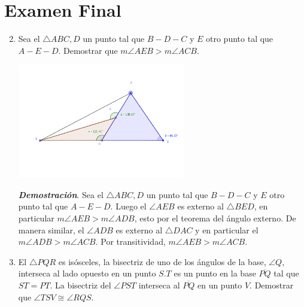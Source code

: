 \documentclass{report}
\begin{document}
    \tableofcontents

    \pagebreak
    \chapter{ Examen Final }

    \begin{enumerate}
        \setcounter{enumi}{1}
        \item Sea el $\triangle A B C, D$ un punto tal que $B-D-C$ y $E$ otro punto tal que $A-E-D$. Demostrar que $m \angle A E B>m \angle A C B$.

        \begin{center}
            \includegraphics*[height=5cm]{images/figura1.png}
        \end{center}
        \textit{\textbf{Demostración}}. Sea el $\triangle A B C, D$ un punto tal que $B-D-C$ y $E$ otro punto tal que $A-E-D$. Luego el $\angle AEB$ es externo al $\triangle BED$, en particular $m\angle AEB > m\angle ADB$, esto por el teorema del ángulo externo. De manera similar, el $\angle ADB$ es externo al $\triangle DAC$ y en particular el $m\angle ADB > m\angle ACB$. Por transitividad, $m\angle AEB > m\angle ACB$.


        \item El $\triangle P Q R$ es isósceles, la bisectriz de uno de los ángulos de la base, $\angle Q$, interseca al lado opuesto en un punto $S . T$ es un punto en la base $\overline{P Q}$ tal que $S T=P T$. La bisectriz del $\angle P S T$ interseca al $\overline{P Q}$ en un punto $V$. Demostrar que $\angle T S V \cong \angle R Q S$.


\end{enumerate}
\end{document}
